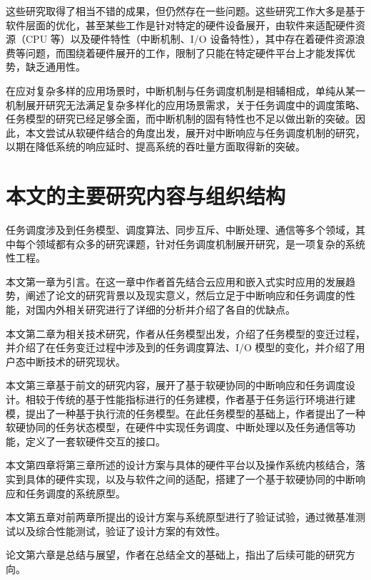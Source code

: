 这些研究取得了相当不错的成果，但仍然存在一些问题。这些研究工作大多是基于软件层面的优化，甚至某些工作是针对特定的硬件设备展开，由软件来适配硬件资源（CPU 等）以及硬件特性（中断机制、I/O 设备特性），其中存在着硬件资源浪费等问题，而围绕着硬件展开的工作，限制了只能在特定硬件平台上才能发挥优势，缺乏通用性。

在应对复杂多样的应用场景时，中断机制与任务调度机制是相辅相成，单纯从某一机制展开研究无法满足复杂多样化的应用场景需求，关于任务调度中的调度策略、任务模型的研究已经足够全面，而中断机制的固有特性也不足以做出新的突破。因此，本文尝试从软硬件结合的角度出发，展开对中断响应与任务调度机制的研究，以期在降低系统的响应延时、提高系统的吞吐量方面取得新的突破。

\section{本文的主要研究内容与组织结构}

任务调度涉及到任务模型、调度算法、同步互斥、中断处理、通信等多个领域，其中每个领域都有众多的研究课题，针对任务调度机制展开研究，是一项复杂的系统性工程。

本文第一章为引言。在这一章中作者首先结合云应用和嵌入式实时应用的发展趋势，阐述了论文的研究背景以及现实意义，然后立足于中断响应和任务调度的性能，对国内外相关研究进行了详细的分析并介绍了各自的优缺点。

本文第二章为相关技术研究，作者从任务模型出发，介绍了任务模型的变迁过程，并介绍了在任务变迁过程中涉及到的任务调度算法、I/O 模型的变化，并介绍了用户态中断技术的研究现状。

本文第三章基于前文的研究内容，展开了基于软硬协同的中断响应和任务调度设计。相较于传统的基于性能指标进行的任务建模，作者基于任务运行环境进行建模，提出了一种基于执行流的任务模型。在此任务模型的基础上，作者提出了一种软硬协同的任务状态模型，在硬件中实现任务调度、中断处理以及任务通信等功能，定义了一套软硬件交互的接口。

本文第四章将第三章所述的设计方案与具体的硬件平台以及操作系统内核结合，落实到具体的硬件实现，以及与软件之间的适配，搭建了一个基于软硬协同的中断响应和任务调度的系统原型。

本文第五章对前两章所提出的设计方案与系统原型进行了验证试验，通过微基准测试以及综合性能测试，验证了设计方案的有效性。

论文第六章是总结与展望，作者在总结全文的基础上，指出了后续可能的研究方向。
